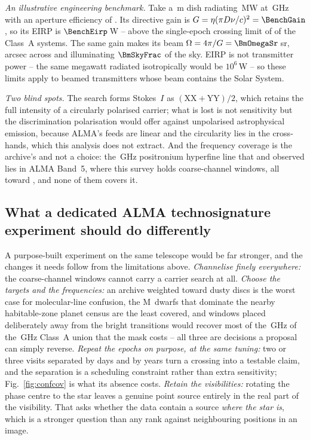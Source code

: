 \noindent\emph{An illustrative engineering benchmark.} Take a \BenchDiam\,m dish radiating \BenchPowerMW\,MW at
\BenchFreqGHz\,GHz with an aperture efficiency of \BenchEta. Its directive
gain is $G=\eta(\pi D\nu/c)^{2}=\BenchGain$, so its EIRP is
$\BenchEirp$\,W -- above the single-epoch crossing limit of \BenchNSysA{} of the
\NSysClassA{} Class~A systems. The same gain makes its beam
$\Omega=4\pi/G=\BmOmegaSr$\,sr, \BmArcsec{} arcsec across and illuminating
$\BmSkyFrac$ of the sky. EIRP is not transmitter power -- the same megawatt
radiated isotropically would be $10^{6}$\,W -- so these limits apply to
beamed transmitters whose beam contains the Solar System.

\noindent\emph{Two blind spots.} The search forms Stokes~$I$ as
$(\mathrm{XX}+\mathrm{YY})/2$, which retains the full intensity of a circularly polarised
carrier; what is lost is not sensitivity but the discrimination polarisation
would offer against unpolarised astrophysical emission, because ALMA's feeds
are linear and the circularity lies in the cross-hands, which this analysis
does not extract. And the frequency coverage is the archive's and not a
choice: the \SbPriorFreqGHz\,GHz positronium hyperfine line that
\citet{Steffes1994} and \citet{Mauersberger1996} observed lies in ALMA Band~5,
where this survey holds
\LnBFiveWin{} coarse-channel windows, all toward \LnBFiveStars, and none of
them covers it.

\subsection{What a dedicated ALMA technosignature experiment should do
differently}
\label{sec:future}

A purpose-built experiment on the same telescope would be far stronger, and
the changes it needs follow from the limitations above. \emph{Channelise
finely everywhere:} the \NCoarse{} coarse-channel windows cannot carry a
carrier search at all.
\emph{Choose the targets and the frequencies:} an archive weighted toward
dusty discs is the worst case for molecular-line confusion, the M~dwarfs that
dominate the nearby habitable-zone planet census are the least covered, and
windows placed deliberately away from the bright transitions would recover
most of the \MkMaskAGHz\,GHz of the \CvUnionA\,GHz Class~A union that the
mask costs -- all three are decisions a
proposal can simply reverse. \emph{Repeat the epochs on purpose, at the same
tuning:} two or three visits separated by days and by years turn a crossing
into a testable claim, and the separation is a scheduling constraint rather
than extra sensitivity; Fig.~\ref{fig:confcov} is what its absence costs.
\emph{Retain the visibilities:} rotating the phase centre to the star leaves a
genuine point source entirely in the real part of the visibility. That asks
whether the data contain a source \emph{where the star is}, which is a
stronger question than any rank
against neighbouring positions in an image.
